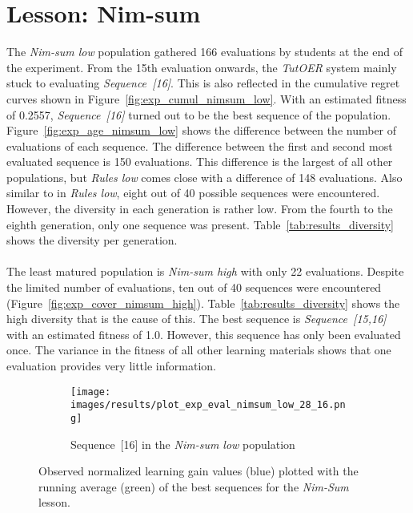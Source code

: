 \section{Lesson: Nim-sum}
\label{sec:results_nimsum}
The \emph{Nim-sum low} population gathered 166 evaluations by students at the
end of the experiment. From the 15th evaluation onwards, the \emph{TutOER}
system mainly stuck to evaluating \emph{Sequence~[16]}. This is also reflected
in the cumulative regret curves shown in Figure~\ref{fig:exp_cumul_nimsum_low}.
With an estimated fitness of 0.2557, \emph{Sequence~[16]} turned out to be the
best sequence of the population. Figure~\ref{fig:exp_age_nimsum_low} shows the
difference between the number of evaluations of each sequence. The difference
between the first and second most evaluated sequence is 150 evaluations. This
difference is the largest of all other populations, but \emph{Rules low} comes
close with a difference of 148 evaluations. Also similar to in \emph{Rules
low}, eight out of 40 possible sequences were encountered. However, the
diversity in each generation is rather low. From the fourth to the eighth
generation, only one sequence was present. Table~\ref{tab:results_diversity}
shows the diversity per generation.\\\\
\noindent
The least matured population is \emph{Nim-sum high} with only 22 evaluations.
Despite the limited number of evaluations, ten out of 40 sequences were
encountered (Figure~\ref{fig:exp_cover_nimsum_high}).
Table~\ref{tab:results_diversity} shows the high diversity that is the cause of
this. The best sequence is \emph{Sequence~[15,16]} with an estimated fitness of
1.0. However, this sequence has only been evaluated once. The variance in the
fitness of all other learning materials shows that one evaluation provides very
little information.

\begin{figure}[ht]
	\begin{subfigure}{0.9\linewidth}
	\centering
	\texttt{[image: images/results/plot\_exp\_eval\_nimsum\_low\_28\_16.png]}
	\caption{Sequence~[16] in the \emph{Nim-sum low} population}
	\label{fig:exp_eval_nimsum_low_28}
	\end{subfigure}
	\caption[Evaluations of the best sequences in Nim-sum]{Observed normalized learning gain values (blue) plotted with the
		running average (green) of the best sequences for the \emph{Nim-Sum}
	lesson.}
	\label{fig:exp_eval_nimsum}
\end{figure}

